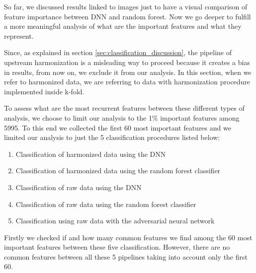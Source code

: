 \documentclass[11pt]{report}
\begin{document}
So far, we discussed results linked to images just to have a visual comparison of feature importance between DNN and random forest.
Now we go deeper to fulfill a more meaningful analysis of what are the important features and what they represent.

Since, as explained in section \ref{sec:classification_discussion}, the pipeline of upstream harmonization is a misleading way to proceed because it creates a bias in results, from now on, we exclude it from our analysis.
In this section, when we refer to harmonized data, we are referring to data with harmonization procedure implemented inside k-fold.

To assess what are the most recurrent features between these different types of analysis, we choose to limit our analysis to the 1\% important features among 5995.
To this end we collected the first 60 most important features and we limited our analysis to just the 5 classification procedures listed below:


\begin{enumerate}
\item Classification of harmonized data using the DNN \label{proc:dnn_kfold}
\item Classification of harmonized data using the random forest classifier \label{proc:rf_kfold}
\item Classification of raw data using the DNN \label{proc:dnn_no}
\item Classification of raw data using the random forest classifier \label{proc:rf_no}
\item Classification using raw data with the adversarial neural network \label{proc:adv}
\end{enumerate}



Firstly we checked if and how many common features we find among the 60 most important features between these five classification.
However, there are no common features between all these 5 pipelines taking into account only the first 60.
\end{document}
